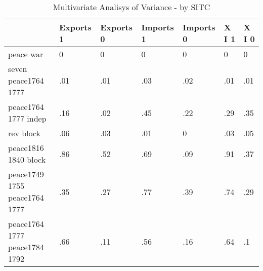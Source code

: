 \begin{table}[htbp]
\caption{\label{tab:manova_test_sitc} Multivariate Analisys of Variance - by SITC}\centering\medskip
\begin{tabular}{|l|l|l|l|l|l|l|}\hline  
 & Exports 1  & Exports 0  & Imports 1  & Imports 0  & X I 1  & X I 0  \\ \hline  
peace war & 0 & 0 & 0 & 0 & 0 & 0 \\ \hline 
seven peace1764 1777 & .01 & .01 & .03 & .02 & .01 & .01 \\ \hline 
peace1764 1777 indep & .16 & .02 & .45 & .22 & .29 & .35 \\ \hline 
rev block & .06 & .03 & .01 & 0 & .03 & .05 \\ \hline 
peace1816 1840 block & .86 & .52 & .69 & .09 & .91 & .37 \\ \hline 
peace1749 1755 peace1764 1777 & .35 & .27 & .77 & .39 & .74 & .29 \\ \hline 
peace1764 1777 peace1784 1792 & .66 & .11 & .56 & .16 & .64 & .1 \\ \hline 
  \end{tabular}
\end{table}
